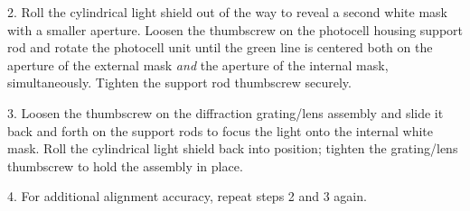 2. Roll the cylindrical light shield out of the way to reveal a second
white mask with a smaller aperture. Loosen the thumbscrew on the
photocell housing support rod and rotate the photocell unit until the
green line is centered both on the aperture of the external mask
\emph{and} the aperture of the internal mask, simultaneously. Tighten
the support rod thumbscrew securely.

3. Loosen the thumbscrew on the diffraction grating/lens assembly and
slide it back and forth on the support rods to focus the light onto the
internal white mask. Roll the cylindrical light shield back into
position; tighten the grating/lens thumbscrew to hold the assembly in
place.

4. For additional alignment accuracy, repeat steps 2 and 3 again.
